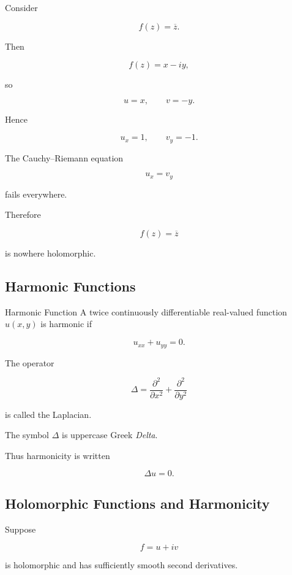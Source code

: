 Consider

\[
f(z)=\overline{z}.
\]

Then

\[
f(z)=x-iy,
\]

so

\[
u=x,
\qquad
v=-y.
\]

Hence

\[
u_x=1,
\qquad
v_y=-1.
\]

The Cauchy--Riemann equation

\[
u_x=v_y
\]

fails everywhere.

Therefore

\[
\boxed{
f(z)=\overline{z}
}
\]

is nowhere holomorphic.

\subsection{Harmonic Functions}
\label{subsec:harmonic-functions}

\begin{definitionbox}{Harmonic Function}
A twice continuously differentiable real-valued function \(u(x,y)\) is
harmonic if

\[
\boxed{
u_{xx}+u_{yy}=0.
}
\]
\end{definitionbox}

The operator

\[
\boxed{
\Delta
=
\frac{\partial^2}{\partial x^2}
+
\frac{\partial^2}{\partial y^2}
}
\]

is called the Laplacian.

The symbol \(\Delta\) is uppercase Greek \emph{Delta}.

Thus harmonicity is written

\[
\boxed{
\Delta u=0.
}
\]

\subsection{Holomorphic Functions and Harmonicity}
\label{subsec:holomorphic-harmonic}

Suppose

\[
f=u+iv
\]

is holomorphic and has sufficiently smooth second derivatives.

